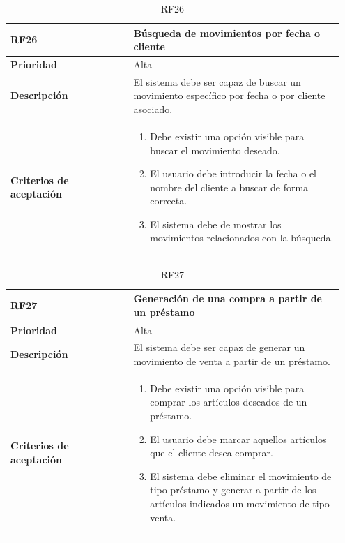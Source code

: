 \begin{table}[H]
	\centering %
	\begin{tabular}{|p{0.35\linewidth}|p{0.6\linewidth}|}
		\hline
		\rowcolor{grayshade} \textbf{RF26} & \textbf{Búsqueda de movimientos por fecha o cliente} \\
		\hline
		\textbf{Prioridad} & Alta \\
		\hline
		\textbf{Descripción} & El sistema debe ser capaz de buscar un movimiento específico por fecha o por cliente asociado.\\
		\hline
		\vspace{0.5mm}
		\textbf{Criterios de aceptación} & 
		\begin{minipage}[t]{0.9\linewidth}
			\begin{enumerate}
				\item Debe existir una opción visible para buscar el movimiento deseado.
				\item El usuario debe introducir la fecha o el nombre del cliente a buscar de forma correcta.
				\item El sistema debe de mostrar los movimientos relacionados con la búsqueda.   
			\end{enumerate}
			\vspace{2mm}
		\end{minipage} \\
		\hline
	\end{tabular}
	\caption{RF26}
\end{table}

\begin{table}[H]
	\centering %
	\begin{tabular}{|p{0.35\linewidth}|p{0.6\linewidth}|}
		\hline
		\rowcolor{grayshade} \textbf{RF27} & \textbf{Generación de una compra a partir de un préstamo} \\
		\hline
		\textbf{Prioridad} & Alta \\
		\hline
		\textbf{Descripción} & El sistema debe ser capaz de generar un movimiento de venta a partir de un préstamo.\\
		\hline
		\vspace{0.5mm}
		\textbf{Criterios de aceptación} & 
		\begin{minipage}[t]{0.9\linewidth}
			\begin{enumerate}
				\item Debe existir una opción visible para comprar los artículos deseados de un préstamo.
				\item El usuario debe marcar aquellos artículos que el cliente desea comprar.
				\item El sistema debe eliminar el movimiento de tipo préstamo y generar a partir de los artículos indicados un movimiento de tipo venta.   
			\end{enumerate}
			\vspace{2mm}
		\end{minipage} \\
		\hline
	\end{tabular}
	\caption{RF27}
\end{table}



